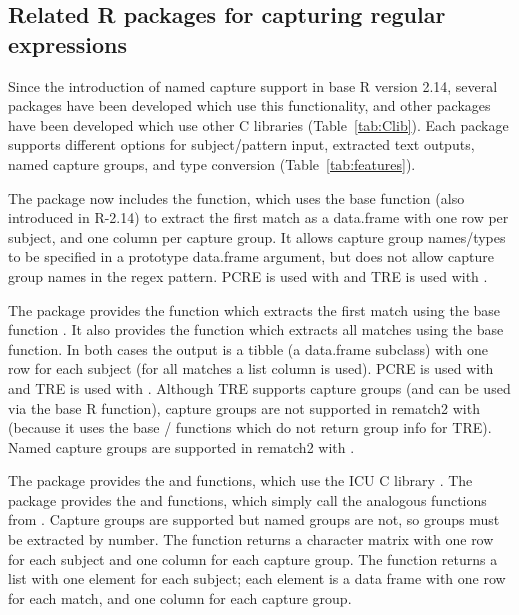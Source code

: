 \subsection{Related R packages for capturing regular expressions}

Since the introduction of named capture support in base R version
2.14, several packages have been developed which use this
functionality, and other packages have been developed which use other
C libraries (Table~\ref{tab:Clib}). Each package supports different
options for subject/pattern input, extracted text outputs, named
capture groups, and type conversion (Table~\ref{tab:features}).

The  package now includes the  function, which uses the
base  function (also introduced in R-2.14) to extract the first
match as a data.frame with one row per subject, and one column per
capture group. It allows capture group names/types to be specified in
a prototype data.frame argument, but does not allow capture group
names in the regex pattern. PCRE is used with 
and TRE is used with .
 
The  package provides the  function which
extracts the first match using the base  function
\citep{rematch2}. It also provides the  function
which extracts all matches using the base  function. In
both cases the output is a tibble (a data.frame subclass) with one row
for each subject (for all matches a list column is used). PCRE is used
with  and TRE is used with . Although
TRE supports capture groups (and can be used via the base R 
function), capture groups are not supported in rematch2 with
 (because it uses the base / functions
which do not return group info for TRE). Named capture groups are
supported in rematch2 with .

The  package provides the  and
 functions, which use the ICU C library
\citep{stringi}. The  package provides the  and
 functions, which simply call the analogous
functions from . Capture groups are supported but named groups
are not, so groups must be extracted by number. The 
function returns a character matrix with one row for each subject and
one column for each capture group. The  function
returns a list with one element for each subject; each element is a
data frame with one row for each match, and one column for each
capture group.

